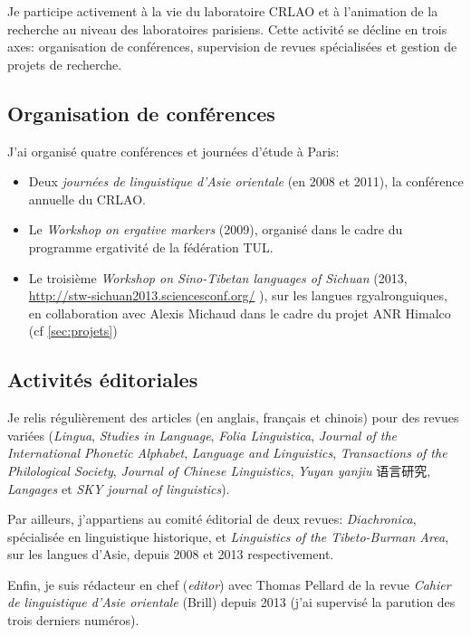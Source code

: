 \documentclass[oldfontcommands,oneside,a4paper,11pt]{article}
\newcommand{\zh}[1]{{\cn #1}}
\begin{document}
Je participe activement à la vie du laboratoire CRLAO et à l'animation de la recherche au niveau des laboratoires parisiens. Cette activité se décline en trois axes: organisation de conférences, supervision de revues spécialisées et gestion de projets de recherche.

\subsection{Organisation de conférences} \label{sec:conf}

J'ai organisé quatre conférences et journées d'étude à Paris:

\begin{itemize}
\item Deux \textit{journées de linguistique d'Asie orientale} (en 2008 et 2011), la conférence annuelle du CRLAO.
\item Le \textit{Workshop on ergative markers} (2009), organisé dans le cadre du programme ergativité de la fédération TUL.
\item Le troisième \textit{Workshop on Sino-Tibetan languages of Sichuan} (2013,    \url{http://stw-sichuan2013.sciencesconf.org/} ), sur les langues rgyalronguiques, en collaboration avec Alexis Michaud dans le cadre du projet ANR Himalco (cf \ref{sec:projets})
 
\end{itemize}



\subsection{Activités éditoriales}\label{sec:editorial}
Je relis régulièrement des articles (en anglais, français et chinois) pour des revues variées (\textit{Lingua}, \textit{Studies in Language}, \textit{Folia Linguistica}, \textit{Journal of the International Phonetic Alphabet},  \textit{Language and Linguistics}, \textit{Transactions of the Philological Society}, \textit{Journal of Chinese Linguistics}, \textit{Yuyan yanjiu} \zh{语言研究}, \textit{Langages} et  \textit{SKY journal of linguistics}).

Par ailleurs, j'appartiens au comité éditorial de deux revues: \textit{Diachronica}, spécialisée en linguistique historique, et \textit{Linguistics of the Tibeto-Burman Area}, sur les langues d'Asie, depuis 2008 et 2013 respectivement.

Enfin, je suis rédacteur en chef (\textit{editor}) avec Thomas Pellard de la revue  \textit{Cahier de linguistique d'Asie orientale} (Brill) depuis 2013 (j'ai supervisé la parution des trois derniers numéros). 
\end{document}
